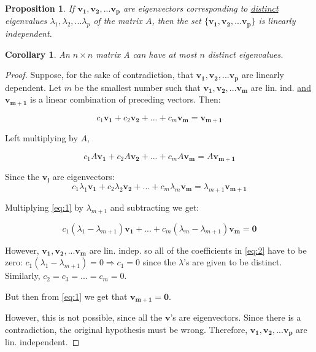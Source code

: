 \documentclass[twocolumn]{article}
\newtheorem{prop}[thm]{Proposition}
\newtheorem{cor}[thm]{Corollary}
\begin{document}
\begin{prop}
If $\bm{v_{1}, v_{2}, ... v_{p}}$ are eigenvectors corresponding to \underline{distinct} eigenvalues ${\lambda_{1}, \lambda_{2}, ... \lambda_{p}}$ of the matrix $A$, then the set $\{\bm{v_{1}, v_{2}, ... v_{p}}\}$ is linearly independent.
\end{prop}

\begin{cor}
An $n \times n$ matrix A can have at most $n$ distinct eigenvalues.
\end{cor}

\begin{proof}
Suppose, for the sake of contradiction, that $\bm{v_{1}, v_{2}, ... v_{p}}$ are linearly dependent. Let $m$ be the smallest number such that $\bm{v_{1}, v_{2}, ... v_{m}}$ are lin. ind. \underline{and} $\bm{v_{m+1}}$ is a linear combination of preceding vectors. Then:

\begin{equation} \label{eq:1}
c_{1}\bm{v_{1}} + c_{2}\bm{v_{2}} + ... + c_{m}\bm{v_{m}} = \bm{v_{m+1}}
\end{equation}

Left multiplying by $A$, 

$$
c_{1}A\bm{v_{1}} + c_{2}A\bm{v_{2}} + ... + c_{m}A\bm{v_{m}} = A\bm{v_{m+1}}
$$

Since the $\bm{v_{i}}$ are eigenvectors: 
$$
c_{1}\lambda_{1}\bm{v_{1}} + c_{2}\lambda_{2}\bm{v_{2}} + ... + c_{m}\lambda_{m}\bm{v_{m}} = \lambda_{m+1}\bm{v_{m+1}}
$$

Multiplying \eqref{eq:1} by $\lambda_{m+1}$ and subtracting we get:

\begin{equation} \label{eq:2}
c_{1}(\lambda_{1} - \lambda_{m+1})\bm{v_{1}} + ... + c_{m}(\lambda_{m} - \lambda_{m+1})\bm{v_{m}} = \bm{0}
\end{equation}

However, $\bm{v_{1}, v_{2}, ... v_{m}}$ are lin. indep. so all of the coefficients in \eqref{eq:2} have to be zero: $c_{1}(\lambda_{1} - \lambda_{m+1}) = 0 \Rightarrow c_{1} = 0$ since the $\lambda$'s are given to be distinct. Similarly, $c_{2} = c_{3} = ... = c_{m} = 0$.

But then from \eqref{eq:1} we get that $\bm{v_{m+1}} = \bm{0}$.

However, this is not possible, since all the $\bm{v}$'s are eigenvectors.
Since there is a contradiction, the original hypothesis must be wrong.
Therefore, $\bm{v_{1}, v_{2}, ... v_{p}}$ are lin. independent.

\end{proof}
\end{document}
